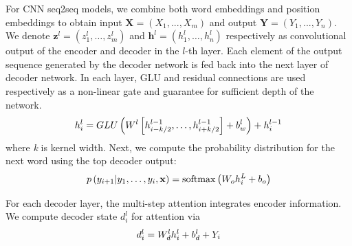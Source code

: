 
For CNN seq2seq models, we combine both word embeddings and position embeddings to obtain input $\mathbf{X} = (X_1,...,X_m)$ and output $\mathbf{Y}=(Y_1,...,Y_n)$. 
We denote $\mathbf { z } ^ { l } = \left( z _ { 1 } ^ { l } , \ldots , z _ { m     } ^ { l } \right)$ and $\mathbf { h } ^ { l } = \left( h _ { 1 } ^ { l } , \ldots , h _ { n } ^ { l } \right)$ 
respectively as convolutional output of the encoder and
decoder in the $l$-th layer.
Each element of the output
sequence generated by the decoder network is fed
back into the next layer of decoder network.
In each layer, GLU \cite{DauphinFAG17} and residual connections \cite{HeZRS16}
are used respectively as a non-linear gate and guarantee for sufficient depth of the network.  
\begin{equation}
\small
    h _ { i } ^ { l } = GLU \left( W ^ { l } \left[ h _ {i-k/2 } ^ { l - 1 } , \ldots , h _ { i+k/2 } ^ { l - 1 } \right] + b _ { w } ^ { l } \right) + h _ { i } ^ { l - 1 }
\end{equation} 
where \textit{k} is kernel width. \DIFaddbegin {}\DIFaddend Next, we compute the probability distribution for the next word
using the top decoder output:
\begin{equation}
\small
    p \left( y _ { i + 1 } | y _ { 1 } , \ldots , y _ { i } , \mathbf { x } \right) = \operatorname { softmax } \left( W _ { o } h _ { i } ^ { L } + b _ { o } \right)
\end{equation}

For each decoder layer, the multi-step attention integrates encoder information. 
We compute decoder state $d_{i}^{l}$ for attention via
\begin{equation}
\small
    d _ { i } ^ { l } = W _ { d } ^ { l } h _ { i } ^ { l } + b _ { d } ^ { l } + Y _ { i }
\end{equation}

